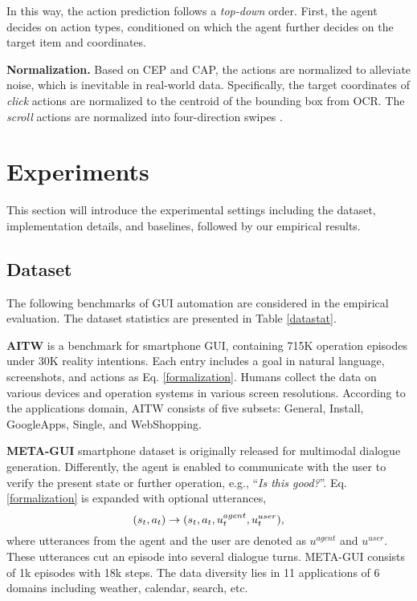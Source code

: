 In this way, the action prediction follows a \textit{top-down} order.
First, the agent decides on action types, conditioned on which the agent further decides on the target item and coordinates.  

\noindent\textbf{Normalization.}
Based on CEP and CAP, the actions are normalized to alleviate noise, which is inevitable in real-world data.
Specifically, the target coordinates of \textit{click} actions are normalized to the centroid of the bounding box from OCR. The \textit{scroll} actions are normalized into four-direction swipes \cite{zhang2023you}. 

\section{Experiments}
This section will introduce the experimental settings including the dataset, implementation details, and baselines, followed by our empirical results.

\subsection{Dataset}
The following benchmarks of GUI automation are considered in the empirical evaluation. The dataset statistics are presented in Table \ref{datastat}.

\textbf{AITW} \cite{rawles2023android} is a benchmark for smartphone GUI, containing 715K operation episodes under 30K reality intentions. Each entry includes a goal in natural language, screenshots, and actions as Eq. \ref{formalization}. Humans collect the data on various devices and operation systems in various screen resolutions.
According to the applications domain, AITW consists of five subsets: General, Install, GoogleApps, Single, and WebShopping. 

\textbf{META-GUI} \cite{sun2022meta} smartphone dataset is originally released for multimodal dialogue generation.
Differently, the agent is enabled to communicate with the user to verify the present state or further operation, e.g., ``\textit{Is this good?}''. 
Eq. \ref{formalization} is expanded with optional utterances,
\begin{equation}
\setlength{\abovedisplayskip}{5pt}
\setlength{\belowdisplayskip}{5pt}
(s_t, a_t) \rightarrow (s_t, a_t, u^{agent}_t, u^{user}_t),
\label{meta}
\end{equation}
where utterances from the agent and the user are denoted as $u^{agent}$ and $u^{user}$.
These utterances cut an episode into several dialogue turns. META-GUI consists of 1k episodes with 18k steps. The data diversity lies in 11 applications of 6 domains including weather, calendar, search, etc. 

